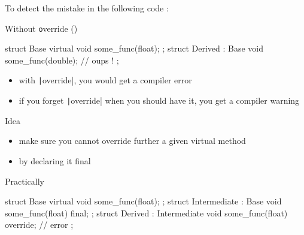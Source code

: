 \begin{frame}[fragile]
  To detect the mistake in the following code :
  \begin{block}{Without {\texttt override} ()}
    \begin{cppcode}
      struct Base {
        virtual void some_func(float);
      };
      struct Derived : Base {
        void some_func(double); // oups !
      };
    \end{cppcode}
  \end{block}
  \begin{itemize}
  \item with \texttt|override|, you would get a compiler error
  \item if you forget \texttt|override| when you should have it, you get a compiler warning
  \end{itemize}
\end{frame}

\begin{frame}[fragile]
  \begin{block}{Idea}
    \begin{itemize}
    \item make sure you cannot override further a given virtual method
    \item by declaring it final
    \end{itemize}
  \end{block}
  \begin{exampleblock}{Practically}
    \begin{cppcode}
      struct Base {
        virtual void some_func(float);
      };
      struct Intermediate : Base {
        void some_func(float) final;
      };
      struct Derived : Intermediate {
        void some_func(float) override; // error
      };
    \end{cppcode}
  \end{exampleblock}
\end{frame}

